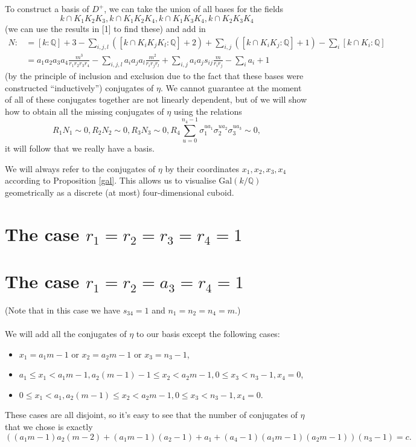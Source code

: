 \documentclass[12pt,a4paper]{article}
\theoremstyle{definition}
\newcommand{\Q}{\mathbb{Q}}
\newcommand{\Gal}{\mathrm{Gal}}
\begin{document}
To construct a basis of $D^+$, we can take the union of all bases for the fields $$k\cap K_1K_2K_3,k\cap K_1K_2K_4,k\cap K_1K_3K_4,k\cap K_2K_3K_4$$ (we can use the results in [1] to find these) and add in
\begin{equation*}
\begin{split}
N:&=[k:\Q]+3-\sum_{i,j,l}([k\cap K_iK_jK_l:\Q]+2)+\sum_{i,j}([k\cap K_iK_j:\Q]+1)-\sum_{i}[k\cap K_i:\Q]\\&=a_1a_2a_3a_4\frac{m^3}{r_1r_2r_3r_4}-\sum_{i,j,l}a_ia_ja_l\frac{m^2}{r_ir_jr_l}+\sum_{i,j}
a_ia_js_{ij}\frac{m}{r_ir_j}-\sum_{i}a_i+1
\end{split}
\end{equation*}
(by the principle of inclusion and exclusion due to the fact that these bases were constructed \enquote{inductively}) conjugates of $\eta$. 
We cannot guarantee at the moment of all of these conjugates together are not linearly dependent, but of we will show how to obtain all the missing conjugates of $\eta$ using the relations $$R_1N_1\sim 0, R_2N_2\sim 0, R_3N_3\sim 0, R_4\sum_{u=0}^{n_4-1}\sigma_1^{ua_1}\sigma_2^{ua_2}\sigma_3^{ua_3}\sim 0,$$
it will follow that we really have a basis.

We will always refer to the conjugates of $\eta$ by their coordinates $x_1,x_2,x_3,x_4$ according to Proposition \ref{gal}. This allows us to visualise $\Gal(k/\Q)$ geometrically as a discrete (at most) four-dimensional cuboid.
\section{The case $r_1=r_2=r_3=r_4=1$}
\section{The case $r_1=r_2=a_3=r_4=1$}
(Note that in this case we have $s_{34}=1$ and $n_1=n_2=n_4=m$.) %
\paragraph*{}
We will add all the conjugates of $\eta$ to our basis except the following cases:
\begin{itemize}
\item $x_1=a_1m-1$ or $x_2=a_2m-1$ or $x_3=n_3-1$,
\item $a_1\leq x_1 < a_1m-1, a_2(m-1)-1 \leq x_2 < a_2m-1, 0\leq x_3 < n_3-1, x_4=0$,
\item $0\leq x_1 < a_1, a_2(m-1) \leq x_2 < a_2m-1, 0\leq x_3 < n_3-1, x_4=0$.
\end{itemize}
These cases are all disjoint, so it's easy to see that the number of conjugates of $\eta$ that we chose is exactly
$$((a_1m-1)a_2(m-2)+(a_1m-1)(a_2-1)+a_1+(a_4-1)(a_1m-1)(a_2m-1))\left(n_3-1\right)=c.$$
\end{document}
